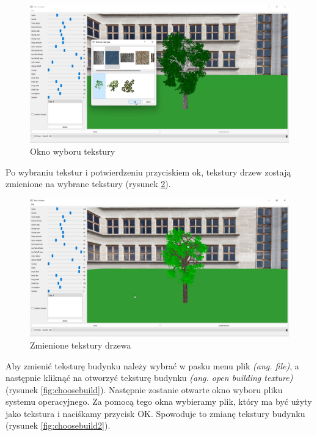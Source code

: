 \documentclass[a4paper,12pt,twoside]{book} %
\begin{document}
\begin{figure}[H]
	\centering\includegraphics[width=15.5cm]{grafika/program/texture2.png}
	\caption{Okno wyboru tekstury}
    \label{fig:texchoosewin}
\end{figure}

Po wybraniu tekstur i potwierdzeniu przyciskiem ok, 
tekstury drzew zostają zmienione na wybrane 
tekstury (rysunek \ref{fig:texchoosewin2}).

\begin{figure}[H]
	\centering\includegraphics[width=15.5cm]{grafika/program/texture3.png}
	\caption{Zmienione tekstury drzewa}
    \label{fig:texchoosewin2}
\end{figure}

Aby zmienić teksturę budynku należy wybrać w pasku menu plik 
\textit{(ang. file)}, a następnie kliknąć na otworzyć 
teksturę budynku \textit{(ang. open building texture)} (rysunek \ref{fig:choosebuild}).
Następnie zostanie otwarte okno wyboru pliku systemu operacyjnego. 
Za pomocą tego okna wybieramy plik, który ma być użyty 
jako tekstura i naciśkamy przycisk OK. 
Spowoduje to zmianę tekstury budynku (rysunek \ref{fig:choosebuild2}).
\end{document}
